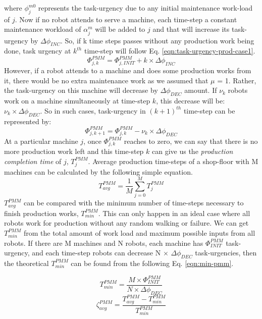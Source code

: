 \documentclass{llncs}
\begin{document}
where $\phi_{j}^{m0}$ represents the task-urgency due to any initial maintenance work-load of $j$.
Now if no robot attends to serve a machine, each time-step a constant maintenance workload of $\alpha_{j}^{m}$ will be added to $j$ and that will increase its task-urgency by $\Delta \phi_{INC}$. So, if k time steps passes without any production work being done, task urgency at $k^{th}$ time-step will follow Eq. \ref{eqn:task-urgency-prod-case1}.
\begin{equation}
\Phi_{j, k}^{PMM} =\Phi_{j, INIT}^{PMM} + k \times \Delta \phi_{INC}
\label{eqn:task-urgency-prod-case1}
\end{equation}
However, if a robot attends to a machine and does some production works from it, there would be no extra maintenance work as we assumed that $\mu$ = 1. Rather, the task-urgency on this machine will decrease by $\Delta \phi_{DEC}$ amount. If $\nu_{k}$ robots work on a machine simultaneously at time-step $k$, this decrease will be: $\nu_{k} \times \Delta \phi_{DEC}$. So in such cases, task-urgency in $(k+1)^{th}$ time-step can be represented by:
\begin{equation}
\Phi_{j, k+1}^{PMM} = \Phi_{j, k}^{PMM} - \nu_{k} \times \Delta \phi_{DEC}
\label{eqn:task-urgency-prod-case2}
\end{equation}
At a particular machine $j$, once $\Phi_{j, k}^{PMM}$ reaches to zero, we can say that there is no more production work left and this time-step $k$ can give us the {\em production completion time} of $j$, $T_{j}^{PMM}$. Average production time-steps of a shop-floor with M machines can be calculated by the following simple equation.
\begin{equation}
T_{avg}^{PMM} = \frac{1}{M} \sum_{j=0}^{M} T_{j}^{PMM} 
\label{eqn:avg-pmm}
\end{equation}
$T_{avg}^{PMM}$ can be compared with the minimum number of time-steps necessary to finish production works, $T_{min}^{PMM}$. This can only happen in an ideal case where all robots work for production without any random walking or failure. We can get $T_{min}^{PMM}$ from the total amount of work load and maximum possible inputs from all robots. If there are M machines and N robots, each machine has $\Phi_{INIT}^{PMM}$ task-urgency, and each time-step robots can decrease N $\times$ $\Delta \phi_{DEC}$ task-urgencies, then the theoretical $T_{min}^{PMM}$ can be found from the following Eq. \ref{eqn:min-pmm}.
%
\begin{multicols}{2}
\small
\begin{equation}
T_{min}^{PMM} = \frac{M \times \Phi_{INIT}^{PMM}}{N \times \Delta \phi_{DEC}} 
\label{eqn:min-pmm}
\end{equation}
\vspace*{0.2cm}
\begin{equation}
\zeta_{avg}^{PMM} = \frac{T_{avg}^{PMM} - T_{min}^{PMM}}{T_{min}^{PMM}} 
\label{eqn:appd}
\end{equation}
\end{multicols}
\end{document}
